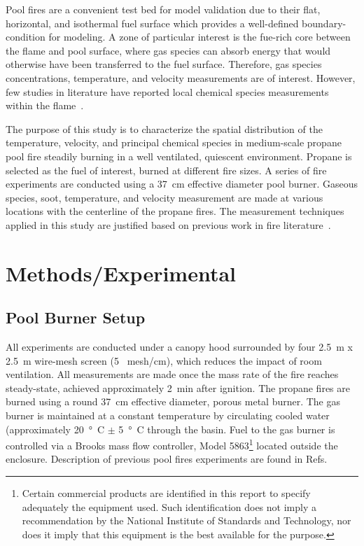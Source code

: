 \documentclass[12pt]{ussci}
\begin{document}
Pool fires are a convenient test bed for model validation due to their flat, horizontal, and isothermal fuel surface which provides a well-defined boundary-condition for modeling. A zone of particular interest is the fue-rich core between the flame and pool surface, where gas species can absorb energy that would otherwise have been transferred to the fuel surface. Therefore, gas species concentrations, temperature, and velocity measurements are of interest. However, few studies in literature have reported local chemical species measurements within the flame~\cite{Fisher1987,Hamins2016,choi1994,andrews2005,meier2000,bundy2007,Lock2008,Falkenstein2020,Falkenstein2020B,Falkenstein2020C,Falkenstein2021,orloff1988general,orloff1987chemical,smith1992major}. 

The purpose of this study is to characterize the spatial distribution of the temperature, velocity, and principal chemical species in medium-scale propane pool fire steadily burning in a well ventilated, quiescent environment. Propane is selected as the fuel of interest, burned at different fire sizes. A series of fire experiments are conducted using a 37~cm effective diameter pool burner. Gaseous species, soot, temperature, and velocity measurement are made at various locations with the centerline of the propane fires. The measurement techniques applied in this study are justified based on previous work in fire literature~\cite{johnsson2007,Choi1995}.


\section{Methods/Experimental}
\subsection{Pool Burner Setup}
All experiments are conducted under a canopy hood surrounded by four 2.5~m x 2.5~m wire-mesh screen (5~ mesh/cm), which reduces the impact of room ventilation. All measurements are made once the mass rate of the fire reaches steady-state, achieved approximately 2~min after ignition. 
The propane fires are burned using a round 37~cm effective diameter, porous metal burner. The gas burner is maintained at a constant temperature by circulating cooled water (approximately \SI{20}{\degree C} $\pm$ \SI{5}{\degree C} through the basin. Fuel to the gas burner is controlled via a Brooks mass flow controller, Model 5863\footnote{\label{fn:product} Certain commercial products are identified in this report to specify adequately the equipment used. Such identification does not imply a recommendation by the National Institute of Standards and Technology, nor does it imply that this equipment is the best available for the purpose.} located outside the enclosure. Description of previous pool fires experiments are found in Refs.~\cite{Hamins2016,Hamins1994,Hamins1991,Hamins1996,Lock2008}
\end{document}
